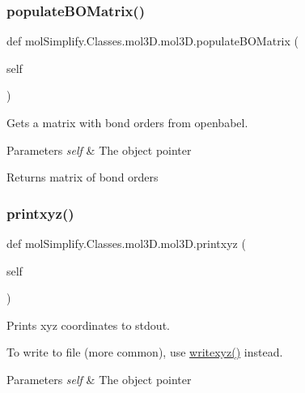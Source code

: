 \subsubsection{\texorpdfstring{populate\+B\+O\+Matrix()}{populateBOMatrix()}}
{\footnotesize\ttfamily def mol\+Simplify.\+Classes.\+mol3\+D.\+mol3\+D.\+populate\+B\+O\+Matrix (\begin{DoxyParamCaption}\item[{}]{self }\end{DoxyParamCaption})}



Gets a matrix with bond orders from openbabel. 


\begin{DoxyParams}{Parameters}
{\em self} & The object pointer \\
\hline
\end{DoxyParams}
\begin{DoxyReturn}{Returns}
matrix of bond orders 
\end{DoxyReturn}
\mbox{\label{classmolSimplify_1_1Classes_1_1mol3D_1_1mol3D_ae6f619f46f387b2b609807fe06a6876a}} 
\subsubsection{\texorpdfstring{printxyz()}{printxyz()}}
{\footnotesize\ttfamily def mol\+Simplify.\+Classes.\+mol3\+D.\+mol3\+D.\+printxyz (\begin{DoxyParamCaption}\item[{}]{self }\end{DoxyParamCaption})}



Prints xyz coordinates to stdout. 

To write to file (more common), use \hyperlink{classmolSimplify_1_1Classes_1_1mol3D_1_1mol3D_a9d338e17fae1e6f4d7a9012a76844e7c}{writexyz()} instead. 
\begin{DoxyParams}{Parameters}
{\em self} & The object pointer \\
\hline
\end{DoxyParams}
\mbox{\label{classmolSimplify_1_1Classes_1_1mol3D_1_1mol3D_a693d0fb9d44650a500c91cac47e93a80}} 
